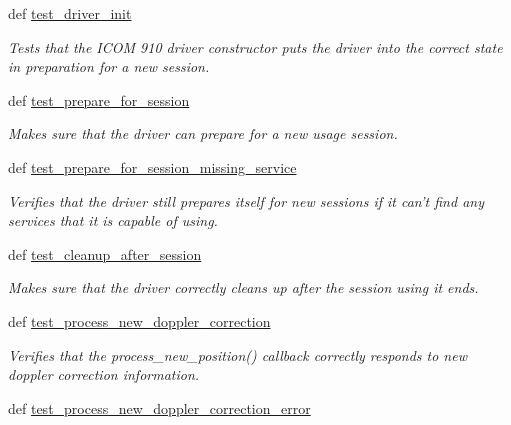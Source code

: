 \begin{DoxyCompactItemize}
\item 
def \hyperlink{classhwm_1_1hardware_1_1devices_1_1drivers_1_1icom__910_1_1tests_1_1test__icom__910_1_1_test_icom910_a66ccb51cda9c3057972ca5c96a862d8d}{test\-\_\-driver\-\_\-init}
\begin{DoxyCompactList}\small\item\em Tests that the I\-C\-O\-M 910 driver constructor puts the driver into the correct state in preparation for a new session. \end{DoxyCompactList}\item 
def \hyperlink{classhwm_1_1hardware_1_1devices_1_1drivers_1_1icom__910_1_1tests_1_1test__icom__910_1_1_test_icom910_a71ca5d64a07ef93acfbd1c4aaa4c6186}{test\-\_\-prepare\-\_\-for\-\_\-session}
\begin{DoxyCompactList}\small\item\em Makes sure that the driver can prepare for a new usage session. \end{DoxyCompactList}\item 
def \hyperlink{classhwm_1_1hardware_1_1devices_1_1drivers_1_1icom__910_1_1tests_1_1test__icom__910_1_1_test_icom910_a897c0fdec7f71c97a00cbdef49090b70}{test\-\_\-prepare\-\_\-for\-\_\-session\-\_\-missing\-\_\-service}
\begin{DoxyCompactList}\small\item\em Verifies that the driver still prepares itself for new sessions if it can't find any services that it is capable of using. \end{DoxyCompactList}\item 
def \hyperlink{classhwm_1_1hardware_1_1devices_1_1drivers_1_1icom__910_1_1tests_1_1test__icom__910_1_1_test_icom910_a8de32473e3c447013454aa9f1e248db3}{test\-\_\-cleanup\-\_\-after\-\_\-session}
\begin{DoxyCompactList}\small\item\em Makes sure that the driver correctly cleans up after the session using it ends. \end{DoxyCompactList}\item 
def \hyperlink{classhwm_1_1hardware_1_1devices_1_1drivers_1_1icom__910_1_1tests_1_1test__icom__910_1_1_test_icom910_aa28ca9025746266ee8a15bc9537b3bab}{test\-\_\-process\-\_\-new\-\_\-doppler\-\_\-correction}
\begin{DoxyCompactList}\small\item\em Verifies that the process\-\_\-new\-\_\-position() callback correctly responds to new doppler correction information. \end{DoxyCompactList}\item 
\hypertarget{classhwm_1_1hardware_1_1devices_1_1drivers_1_1icom__910_1_1tests_1_1test__icom__910_1_1_test_icom910_aa6750dbeee332855768c3c92c3bd1a30}{def \hyperlink{classhwm_1_1hardware_1_1devices_1_1drivers_1_1icom__910_1_1tests_1_1test__icom__910_1_1_test_icom910_aa6750dbeee332855768c3c92c3bd1a30}{test\-\_\-process\-\_\-new\-\_\-doppler\-\_\-correction\-\_\-error}}\label{classhwm_1_1hardware_1_1devices_1_1drivers_1_1icom__910_1_1tests_1_1test__icom__910_1_1_test_icom910_aa6750dbeee332855768c3c92c3bd1a30}


\end{DoxyCompactItemize}
